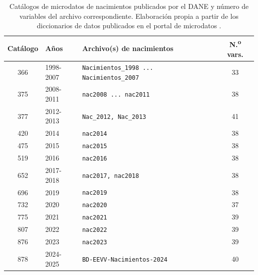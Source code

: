 \begin{table}[!htbp]
\centering
\caption[Catálogos de microdatos de nacimientos publicados por el DANE]{Catálogos de microdatos de nacimientos publicados por el DANE y número de
variables del archivo correspondiente. Elaboración propia a partir de los diccionarios
de datos publicados en el portal de microdatos \citep{dane2024}.}
\label{tab:catalogos}
\small
\begin{tabularx}{\textwidth}{@{}clXc@{}}
\toprule
\textbf{Catálogo} & \textbf{Años} & \textbf{Archivo(s) de nacimientos} & \textbf{N.\textsuperscript{o} vars.} \\
\midrule
366 & 1998-2007 & \texttt{Nacimientos\_1998 ... Nacimientos\_2007} & 33 \\
375 & 2008-2011 & \texttt{nac2008 ... nac2011} & 38 \\
377 & 2012-2013 & \texttt{Nac\_2012, Nac\_2013} & 41 \\
420 & 2014 & \texttt{nac2014} & 38 \\
475 & 2015 & \texttt{nac2015} & 38 \\
519 & 2016 & \texttt{nac2016} & 38 \\
652 & 2017-2018 & \texttt{nac2017, nac2018} & 38 \\
696 & 2019 & \texttt{nac2019} & 38 \\
732 & 2020 & \texttt{nac2020} & 37 \\
775 & 2021 & \texttt{nac2021} & 39 \\
807 & 2022 & \texttt{nac2022} & 39 \\
876 & 2023 & \texttt{nac2023} & 39 \\
878 & 2024-2025 & \texttt{BD-EEVV-Nacimientos-2024} & 40 \\
\bottomrule
\end{tabularx}
\end{table}
